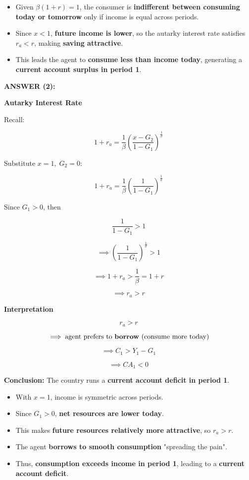 \documentclass[12pt]{article}
\begin{document}
\begin{itemize}
    \item Given \( \beta(1+r) = 1 \), the consumer is \textbf{indifferent between consuming today or tomorrow} only if income is equal across periods.
    
    \item Since \( x < 1 \), \textbf{future income is lower}, so the autarky interest rate satisfies \( r_a < r \), making \textbf{saving attractive}.
    
    \item This leads the agent to \textbf{consume less than income today}, generating a \textbf{current account surplus in period 1}.
\end{itemize}

\vspace{0.5em}
\noindent\textcolor{formalred}{\textbf{ANSWER (2):}}

\textbf{Autarky Interest Rate}

Recall:

\[
1+r_a = \frac{1}{\beta} \left( \frac{x-G_2}{1-G_1} \right)^{\tfrac{1}{\sigma}}
\]

Substitute \( x=1, \; G_2=0 \):

\[
1+r_a = \frac{1}{\beta} \left( \frac{1}{1-G_1} \right)^{\tfrac{1}{\sigma}}
\]

Since \( G_1 > 0 \), then 

\[
\frac{1}{1-G_1} > 1
\]

\[
\implies \left( \frac{1}{1-G_1} \right)^{\tfrac{1}{\sigma}} > 1
\]

\[
\implies 1+r_a > \frac{1}{\beta} = 1+r
\]

\[
\implies r_a > r
\]

\textbf{Interpretation}

\[
r_a > r
\]

\[
\implies \text{agent prefers to \textbf{borrow} (consume more today)}
\]

\[
\implies C_1 > Y_1 - G_1
\]

\[
\implies CA_1 < 0
\]

\textbf{Conclusion:} The country runs a \textbf{current account deficit in period 1}.

\begin{itemize}
    \item With \( x = 1 \), income is symmetric across periods.  
    \item Since \( G_1 > 0 \), \textbf{net resources are lower today}.  
    \item This makes \textbf{future resources relatively more attractive}, so \( r_a > r \).  
    \item The agent \textbf{borrows to smooth consumption} "spreading the pain".  
    \item Thus, \textbf{consumption exceeds income in period 1}, leading to a \textbf{current account deficit}.
\end{itemize}
\end{document}
